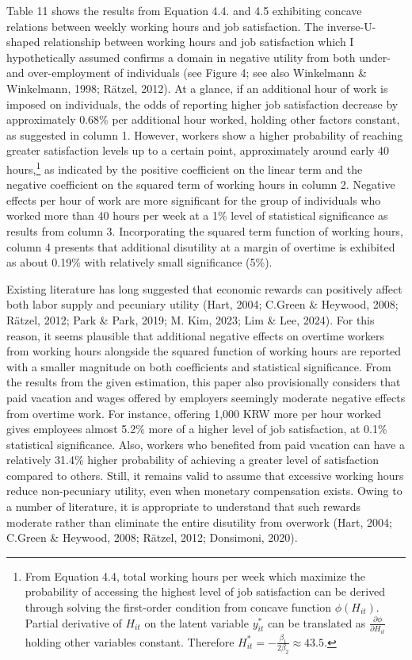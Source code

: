 \documentclass[
  12pt,
]{article}
\begin{document}
Table 11 shows the results from Equation 4.4. and 4.5 exhibiting concave
relations between weekly working hours and job satisfaction. The
inverse-U-shaped relationship between working hours and job satisfaction
which I hypothetically assumed confirms a domain in negative utility
from both under- and over-employment of individuals (see Figure 4; see
also Winkelmann \& Winkelmann, 1998; Rätzel, 2012). At a glance, if an
additional hour of work is imposed on individuals, the odds of reporting
higher job satisfaction decrease by approximately 0.68\% per additional
hour worked, holding other factors constant, as suggested in column 1.
However, workers show a higher probability of reaching greater
satisfaction levels up to a certain point, approximately around early 40
hours,\footnote{From Equation 4.4, total working hours per week which
  maximize the probability of accessing the highest level of job
  satisfaction can be derived through solving the first-order condition
  from concave function \(\phi(H_{it})\). Partial derivative of
  \(H_{it}\) on the latent variable \(y^*_{it}\) can be translated as
  \(\frac{\partial \phi}{\partial H_{it}}\) holding other variables
  constant. Therefore
  \(H^*_{it} = - \frac{\beta_1}{2\beta_2} \approx 43.5\).} as indicated
by the positive coefficient on the linear term and the negative
coefficient on the squared term of working hours in column 2. Negative
effects per hour of work are more significant for the group of
individuals who worked more than 40 hours per week at a 1\% level of
statistical significance as results from column 3. Incorporating the
squared term function of working hours, column 4 presents that
additional disutility at a margin of overtime is exhibited as about
0.19\% with relatively small significance (5\%).

Existing literature has long suggested that economic rewards can
positively affect both labor supply and pecuniary utility (Hart, 2004;
C.Green \& Heywood, 2008; Rätzel, 2012; Park \& Park, 2019; M. Kim,
2023; Lim \& Lee, 2024). For this reason, it seems plausible that
additional negative effects on overtime workers from working hours
alongside the squared function of working hours are reported with a
smaller magnitude on both coefficients and statistical significance.
From the results from the given estimation, this paper also
provisionally considers that paid vacation and wages offered by
employers seemingly moderate negative effects from overtime work. For
instance, offering 1,000 KRW more per hour worked gives employees almost
5.2\% more of a higher level of job satisfaction, at 0.1\% statistical
significance. Also, workers who benefited from paid vacation can have a
relatively 31.4\% higher probability of achieving a greater level of
satisfaction compared to others. Still, it remains valid to assume that
excessive working hours reduce non-pecuniary utility, even when monetary
compensation exists. Owing to a number of literature, it is appropriate
to understand that such rewards moderate rather than eliminate the
entire disutility from overwork (Hart, 2004; C.Green \& Heywood, 2008;
Rätzel, 2012; Donsimoni, 2020).
\end{document}
